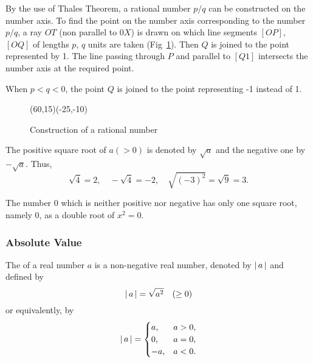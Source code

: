 \documentclass[11pt]{amsbook}
\begin{document}
By the use of Thales Theorem, 
a rational number $p/q$ can be constructed on the number axis. 
To find the point on the number axis 
corresponding to the number $p/q$, 
a ray $OT$ (non parallel to $0X$) is drawn 
on which line segments $[OP]$, $[OQ]$ of lengths $p$, $q$ units are taken (Fig~\ref{fig:constructionRationalNumber}). 
Then $Q$ is joined to the point represented by 1. 
The line passing through $P$ and parallel to $[Q1]$ intersects the number axis at the required point.

When $p < q < 0$, the point $Q$ is joined to 
the point representing -1 instead of 1.

\begin{figure}
	\center
	\begin{picture}(60,15)(-25,-10)
	\end{picture}
	\caption{Construction of a rational number}
	\label{fig:constructionRationalNumber}
\end{figure}

The positive square root of $a ( > 0)$ is denoted by $\sqrt{a}$ and 
the negative one by $- \sqrt{a}$. 
Thus, 
\[
	\sqrt{4} = 2, \quad 
	-\sqrt{4} = -2, \quad 
	\sqrt{(-3)^{2}} = \sqrt{9} = 3.
\]

The number $0$ which is neither positive nor negative 
has only one square root, namely $0$, 
as a double root of $x^{2} = 0$.




\subsubsection{Absolute Value}
\label{subsubsec:AbsoluteValue}

The  of a real number $a$ is 
a non-negative real number, denoted by $\left \lvert \, a \, \right \rvert$ and defined by
\[
	\left \lvert \, a \, \right \rvert = \sqrt{a^2} \quad (\geq 0)
\]
or equivalently, by
\[ 
	\left \lvert \, a \, \right \rvert 
	= 
	\begin{cases}
		a, 	&a > 0, \\
		0,	&a = 0, \\
		-a,	&a < 0.
	\end{cases}
\]
\end{document}
